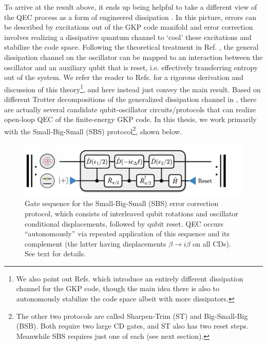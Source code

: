 To arrive at the result above, it ends up being helpful to take a different view of the QEC process as a form of engineered dissipation \cite{royer2020gkp, vlad2023thesis}. In this picture, errors can be described by excitations out of the GKP code manifold and error correction involves realizing a dissipative quantum channel to `cool' these excitations and stabilize the code space. Following the theoretical treatment in Ref. \cite{royer2020gkp}, the general dissipation channel on the oscillator can be mapped to an interaction between the oscillator and an auxiliary qubit that is reset, i.e. effectively transferring entropy out of the system. We refer the reader to Refs. \cite{royer2020gkp, sivak2023gkp-expt, vlad2023thesis} for a rigorous derivation and discussion of this theory\footnote{We also point out Refs. \cite{sellem2023gkp, sellem2024gkp} which introduce an entirely different dissipation channel for the GKP code, though the main idea there is also to autonomously stabilize the code space albeit with more dissipators.}, and here instead just convey the main result. Based on different Trotter decompositions of the generalized dissipation channel in \cite{royer2020gkp}, there are actually several candidate qubit-oscillator circuits/protocols that can realize open-loop QEC of the finite-energy GKP code. In this thesis, we work primarily with the Small-Big-Small (SBS) protocol\footnote{The other two protocols are called Sharpen-Trim (ST) and Big-Small-Big (BSB). Both require two large CD gates, and ST also has two reset steps. Meanwhile SBS requires just one of each (see next section).}, shown below. 
\begin{figure}[h]
    \centering
    \includegraphics[width=0.85\linewidth]{Figures/2/SBS.pdf}
    \caption{Gate sequence for the Small-Big-Small (SBS) error correction protocol, which consists of interleaved qubit rotations and oscillator conditional displacements, followed by qubit reset. QEC occurs ``autonomously'' via repeated application of this sequence and its complement (the latter having displacements $\beta \to i\beta$ on all CDs). See text for details.}
    \label{fig:2-SBS}
\end{figure}

